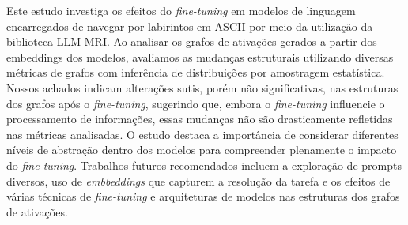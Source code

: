 
\begin{resumoutfpr}%
    Este estudo investiga os efeitos do \textit{fine-tuning} em modelos de linguagem encarregados de navegar por labirintos em ASCII por meio da utilização da biblioteca LLM-MRI. Ao analisar os grafos de ativações gerados a partir dos embeddings dos modelos, avaliamos as mudanças estruturais utilizando diversas métricas de grafos com inferência de distribuições por amostragem estatística. Nossos achados indicam alterações sutis, porém não significativas, nas estruturas dos grafos após o \textit{fine-tuning}, sugerindo que, embora o \textit{fine-tuning} influencie o processamento de informações, essas mudanças não são drasticamente refletidas nas métricas analisadas. O estudo destaca a importância de considerar diferentes níveis de abstração dentro dos modelos para compreender plenamente o impacto do \textit{fine-tuning}. Trabalhos futuros recomendados incluem a exploração de prompts diversos, uso de \textit{embbeddings} que capturem a resolução da tarefa e os efeitos de várias técnicas de \textit{fine-tuning} e arquiteturas de modelos nas estruturas dos grafos de ativações.
\end{resumoutfpr}
